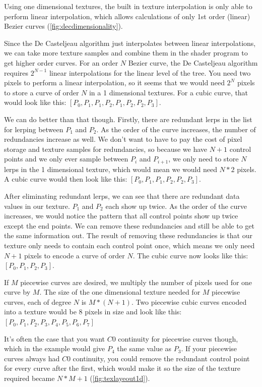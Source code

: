 \documentclass{jcgt}
\begin{document}
Using one dimensional textures, the built in texture interpolation is only able to perform linear interpolation, which allows calculations of only 1st order (linear) Bezier curves (\autoref{fig:decdimensionality}).

Since the De Casteljeau algorithm just interpolates between linear interpolations, we can take more texture samples and combine them in the shader program to get higher order curves.  For an order $N$ Bezier curve, the De Casteljeau algorithm requires $2^{N-1}$ linear interpolations for the linear level of the tree.  You need two pixels to perform a linear interpolation, so it seems that we would need $2^N$ pixels to store a curve of order $N$ in a 1 dimensional textures.  For a cubic curve, that would look like this: $[P_0,P_1,P_1,P_2,P_1,P_2,P_2,P_3]$.

We can do better than that though.  Firstly, there are redundant lerps in the list for lerping between $P_1$ and $P_2$.  As the order of the curve increases, the number of redundancies increase as well.  We don't want to have to pay the cost of pixel storage and texture samples for redundancies, so because we have $N+1$ control points and we only ever sample between  $P_i$ and $P_{i+1}$, we only need to store $N$ lerps in the 1 dimensional texture, which would mean we would need $N*2$ pixels.  A cubic curve would then look like this:  $[P_0,P_1,P_1,P_2,P_2,P_3]$.

After eliminating redundant lerps, we can see that there are redundant data values in our texture.  $P_1$ and $P_2$ each show up twice.  As the order of the curve increases, we would notice the pattern that all control points show up twice except the end points.  We can remove these redundancies and still be able to get the same information out.  The result of removing these redundancies is that our texture only needs to contain each control point once, which means we only need $N+1$ pixels to encode a curve of order $N$.  The cubic curve now looks like this: $[P_0,P_1,P_2,P_3]$. 

If $M$ piecewise curves are desired, we multiply the number of pixels used for one curve by $M$.  The size of the one dimensional texture needed for $M$ piecewise curves, each of degree $N$ is $M*(N+1)$. Two piecewise cubic curves encoded into a texture would be 8 pixels in size and look like this: $[P_0,P_1,P_2,P_3,P_4,P_5,P_6,P_7]$

It's often the case that you want $C0$ continuity for piecewise curves though, which in the example would give $P_4$ the same value as $P_3$.  If your piecewise curves always had $C0$ continuity, you could remove the redundant control point for every curve after the first, which would make it so the size of the texture required became $N*M+1$ (\autoref{fig:texlayeout1d}).
\end{document}
